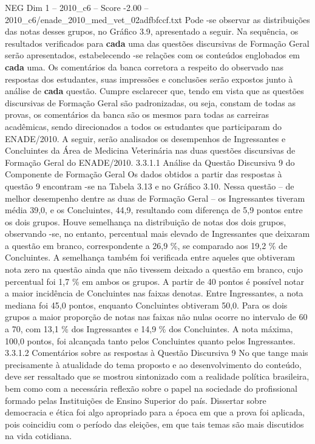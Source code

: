\begin{textsample}{NEG Dim 1 – 2010\_c6 – Score -2.00 – 2010\_c6/enade\_2010\_med\_vet\_02adfbfccf.txt}
Pode -se observar as distribuições das notas desses grupos, no Gráfico 3.9, apresentado a seguir.
Na sequência, os resultados verificados para \textbf{cada} uma das questões discursivas de Formação Geral serão apresentados, estabelecendo -se relações com os conteúdos englobados em \textbf{cada} uma.
Os comentários da banca corretora a respeito do observado nas respostas dos estudantes, suas impressões e conclusões serão expostos junto à análise de \textbf{cada} questão.
Cumpre esclarecer que, tendo em vista que as questões discursivas de Formação Geral são padronizadas, ou seja, constam de todas as provas, os comentários da banca são os mesmos para todas as carreiras acadêmicas, sendo direcionados a todos os estudantes que participaram do ENADE/2010.
A seguir, serão analisados os desempenhos de Ingressantes e Concluintes da Área de Medicina Veterinária nas duas questões discursivas de Formação Geral do ENADE/2010. 3.3.1.1 Análise da Questão Discursiva 9 do Componente de Formação Geral Os dados obtidos a partir das respostas à questão 9 encontram -se na Tabela 3.13 e no Gráfico 3.10.
Nessa questão – de melhor desempenho dentre as duas de Formação Geral – os Ingressantes tiveram média 39,0, e os Concluintes, 44,9, resultando com diferença de 5,9 pontos entre os dois grupos.
Houve semelhança na distribuição de notas dos dois grupos, observando -se, no entanto, percentual mais elevado de Ingressantes que deixaram a questão em branco, correspondente a 26,9 \%, se comparado aos 19,2 \% de Concluintes.
A semelhança também foi verificada entre aqueles que obtiveram nota zero na questão ainda que não tivessem deixado a questão em branco, cujo percentual foi 1,7 \% em ambos os grupos.
A partir de 40 pontos é possível notar a maior incidência de Concluintes nas faixas denotas.
Entre Ingressantes, a nota mediana foi 45,0 pontos, enquanto Concluintes obtiveram 50,0.
Para os dois grupos a maior proporção de notas nas faixas não nulas ocorre no intervalo de 60 a 70, com 13,1 \% dos Ingressantes e 14,9 \% dos Concluintes.
A nota máxima, 100,0 pontos, foi alcançada tanto pelos Concluintes quanto pelos Ingressantes. 3.3.1.2 Comentários sobre as respostas à Questão Discursiva 9 No que tange mais precisamente à atualidade do tema proposto e ao desenvolvimento do conteúdo, deve ser ressaltado que se mostrou sintonizado com a realidade política brasileira, bem como com a necessária reflexão sobre o papel na sociedade do profissional formado pelas Instituições de Ensino Superior do país.
Dissertar sobre democracia e ética foi algo apropriado para a época em que a prova foi aplicada, pois coincidiu com o período das eleições, em que tais temas são mais discutidos na vida cotidiana.

\end{textsample}
